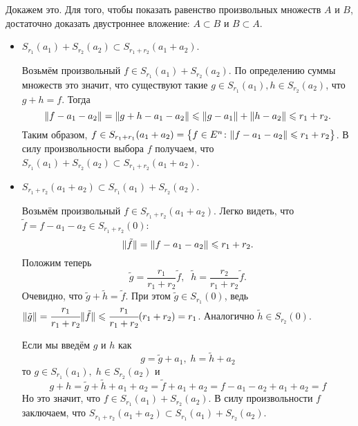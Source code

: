\begin{exmp}
\begin{center}
\begin{tikzpicture}
        \end{tikzpicture}
    \end{center}

    Докажем это.
    Для того, чтобы показать равенство произвольных множеств $A$ и $B$, достаточно доказать двустроннее вложение: 
    $A \subset B$ и $B \subset A$.
    \begin{itemize}
        \item 
            $S_{r_1}(a_1) + S_{r_2}(a_2) \subset S_{r_1 + r_2}(a_1 + a_2)$. 

            Возьмём произвольный $f \in S_{r_1}(a_1) + S_{r_2}(a_2)$.
            По определению суммы множеств это значит, что существуют такие $g \in S_{r_1}(a_1), h \in S_{r_2}(a_2)$, что $g + h = f$.
            Тогда 
            \begin{equation*}
                \Norm{f - a_1 - a_2} = \Norm{g + h - a_1 - a_2} \leqslant \Norm{g - a_1} + \Norm{h - a_2} \leqslant r_1 + r_2.
            \end{equation*}
            Таким образом, $f \in S_{r_1 + r_1}(a_1 + a_2) = \bigl\{f \in E^n \colon \Norm{f - a_1 - a_2} \leqslant r_1 + r_2 \bigr\}$.
            В силу произвольности выбора $f$ получаем, что $S_{r_1}(a_1) + S_{r_2}(a_2) \subset S_{r_1 + r_2}(a_1 + a_2)$.
        \item 
            $S_{r_1 + r_2}(a_1 + a_2) \subset S_{r_1}(a_1) + S_{r_2}(a_2)$.

            Возьмём произвольный $f \in S_{r_1 + r_2}(a_1 + a_2)$.
            Легко видеть, что ${\tilde{f} = f - a_1 - a_2 \in S_{r_1 + r_2}(0)}$:
            \begin{equation*}
                \Norm{\tilde{f}} = \Norm{f - a_1 - a_2} \leqslant r_1 + r_2.
            \end{equation*}
            Положим теперь 
            \begin{equation*}
                \tilde{g} = \frac{r_1}{r_1 + r_2} \tilde{f}, \;\; \tilde{h} = \frac{r_2}{r_1 + r_2} \tilde{f}.
            \end{equation*}
            Очевидно, что $\tilde{g} + \tilde{h} = \tilde{f}$.
            При этом $\tilde{g} \in S_{r_1}(0)$, ведь $\Norm{\tilde{g}} = \cfrac{r_1}{r_1 + r_2}\Norm{\tilde{f}} \leqslant \cfrac{r_1}{r_1 + r_2} (r_1 + r_2) = r_1$.
            Аналогично $\tilde{h} \in S_{r_2}(0)$.

            Если мы введём $g$ и $h$ как 
            \begin{equation*}
                g = \tilde{g} + a_1, \; h = \tilde{h} + a_2
            \end{equation*}
            то $g \in S_{r_1}(a_1), \; h \in S_{r_2}(a_2)$ и 
            \begin{equation*}
                g + h = \tilde{g} + \tilde{h} + a_1 + a_2 = \tilde{f} + a_1 + a_2 = f - a_1 - a_2 + a_1 + a_2 = f
            \end{equation*}
            Но это значит, что $f \in S_{r_1}(a_1) + S_{r_2}(a_2)$.
            В силу произвольности $f$ заключаем, что $S_{r_1 + r_2}(a_1 + a_2) \subset S_{r_1}(a_1) + S_{r_2}(a_2)$.
    \end{itemize}
\end{exmp}